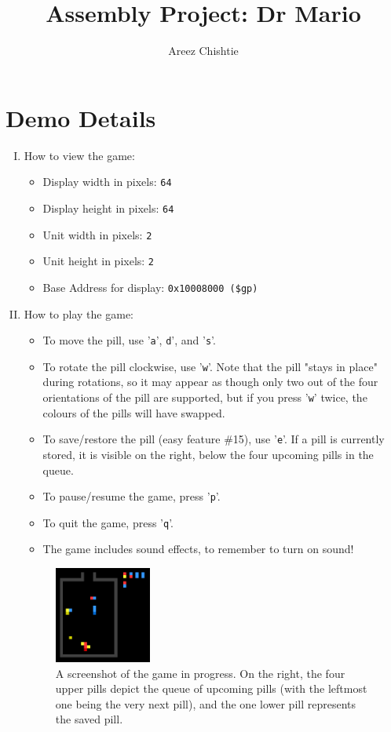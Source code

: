 \documentclass{article}
\title{Assembly Project: Dr Mario}
\author{Areez Chishtie}
\begin{document}
\maketitle

\section{Demo Details}

\begin{enumerate}[(I)]

\item How to view the game:

\begin{itemize}
\item Display width in pixels: \texttt{64}
\item Display height in pixels: \texttt{64}
\item Unit width in pixels: \texttt{2}
\item Unit height in pixels: \texttt{2}
\item Base Address for display: \texttt{0x10008000 (\$gp)}
\end{itemize}

\item How to play the game:

\begin{itemize}
\item To move the pill, use '\texttt{a}', \texttt{d}', and '\texttt{s}'.
\item To rotate the pill clockwise, use '\texttt{w}'. Note that the pill "stays in place" during rotations, so it may appear as though only two out of the four orientations of the pill are supported, but if you press '\texttt{w}' twice, the colours of the pills will have swapped.
\item To save/restore the pill (easy feature \#15), use '\texttt{e}'. If a pill is currently stored, it is visible on the right, below the four upcoming pills in the queue.
\item To pause/resume the game, press '\texttt{p}'.
\item To quit the game, press '\texttt{q}'.
\item The game includes sound effects, to remember to turn on sound!
\end{itemize}

\begin{figure}[ht!]
\centering
\includegraphics[width=0.3\textwidth]{Images/game.png}
\caption{A screenshot of the game in progress. On the right, the four upper pills depict the queue of upcoming pills (with the leftmost one being the very next pill), and the one lower pill represents the saved pill.}
\label{fig:game}
\end{figure}

\end{enumerate}
\end{document}
